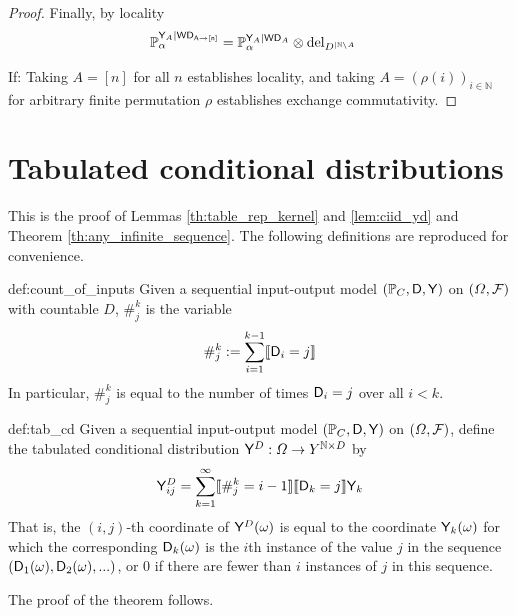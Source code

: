 \begin{proof}
Finally, by locality
\begin{align}
    \mathbb{P}_\alpha^{\mathsf{Y}_A|\mathsf{WD_{A\rightarrow [n]}}} &= \mathbb{P}_\alpha^{\mathsf{Y}_A|\mathsf{WD}_A}\otimes \text{del}_{D^{|\mathbb{N}\setminus A}}
\end{align}

If:
Taking $A=[n]$ for all $n$ establishes locality, and taking $A=(\rho(i))_{i\in \mathbb{N}}$ for arbitrary finite permutation $\rho$ establishes exchange commutativity.
\end{proof}

\section{Tabulated conditional distributions}\label{sec:io_contract_models}

This is the proof of Lemmas \ref{th:table_rep_kernel} and \ref{lem:ciid_yd} and Theorem \ref{th:any_infinite_sequence}. The following definitions are reproduced for convenience.

\begin{repdefinition}{def:count_of_inputs}
Given a sequential input-output model $(\mathbb{P}_C,\mathsf{D},\mathsf{Y})$ on $(\Omega,\mathcal{F})$ with countable $D$, $\#_{j}^k$ is the variable
\begin{align}
    \#_{j}^k := \sum_{i=1}^{k-1} \llbracket \mathsf{D}_i = j \rrbracket
\end{align}
In particular, $\#_{j}^k$ is equal to the number of times $\mathsf{D}_i=j$ over all $i<k$.
\end{repdefinition}

\begin{repdefinition}{def:tab_cd}
Given a sequential input-output model $(\mathbb{P}_C,\mathsf{D},\mathsf{Y})$ on $(\Omega,\mathcal{F})$, define the tabulated conditional distribution $\mathsf{Y}^D:\Omega\to Y^{\mathbb{N}\times D}$ by
\begin{align}
    \mathsf{Y}^D_{ij} = \sum_{k=1}^{\infty} \llbracket \#_j^k = i-1\rrbracket \llbracket \mathsf{D}_k = j \rrbracket \mathsf{Y}_k
\end{align}
That is, the $(i,j)$-th coordinate of $\mathsf{Y}^D(\omega)$ is equal to the coordinate $\mathsf{Y}_k(\omega)$ for which the corresponding $\mathsf{D}_k(\omega)$ is the $i$th instance of the value $j$ in the sequence $(\mathsf{D}_1(\omega),\mathsf{D}_2(\omega),...)$, or 0 if there are fewer than $i$ instances of $j$ in this sequence.
\end{repdefinition}

The proof of the theorem follows.

